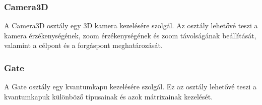 \documentclass[fontsize=12pt,a4paper]{article}
\begin{document}
\begin{table}[h!]
    \centering
\end{table}

\newpage
\subsubsection{Camera3D}

A Camera3D osztály egy 3D kamera kezelésére szolgál. Az osztály lehetővé teszi a kamera érzékenységének, zoom érzékenységének és zoom távolságának beállítását, valamint a célpont és a forgáspont meghatározását.

\begin{table}[h!]
    \centering
\end{table}

\subsubsection{Gate}

A Gate osztály egy kvantumkapu kezelésére szolgál. Ez az osztály lehetővé teszi a kvantumkapuk különböző típusainak és azok mátrixainak kezelését.
\end{document}
